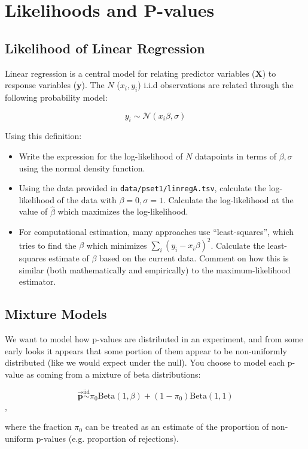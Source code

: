 \documentclass{pset}
\begin{document}
\section*{Likelihoods and P-values}

\subsection*{Likelihood of Linear Regression}

Linear regression is a central model for relating predictor variables ($\mathbf{X}$) to response variables ($\mathbf{y}$). The $N$ ($x_i, y_i$) i.i.d observations are related through the following probability model: 

$$y_i \sim \mathcal{N}(x_i\beta, \sigma)$$ 

Using this definition:

\begin{itemize}
\item Write the expression for the log-likelihood of $N$ datapoints in terms of $\beta,\sigma$ using the normal density function.
\item Using the data provided in \texttt{data/pset1/linregA.tsv}, calculate the log-likelihood of the data with $\beta = 0,\sigma=1$. Calculate the log-likelihood at the value of $\hat{\beta}$ which maximizes the log-likelihood. 
\item For computational estimation, many approaches use ``least-squares'', which tries to find the $\beta$ which minimizes $\sum_i (y_i - x_i\beta)^2$. Calculate the least-squares estimate of $\beta$ based on the current data. Comment on how this is similar (both mathematically and empirically) to the maximum-likelihood estimator.
\end{itemize}

\subsection*{Mixture Models}

We want to model how p-values are distributed in an experiment, and from some early looks it appears that some portion of them appear to be non-uniformly distributed (like we would expect under the null). You choose to model each p-value as coming from a mixture of beta distributions:

$$\overrightarrow{\mathbf{p}} \overset{\text{iid}}{\sim} \pi_0 \text{Beta}(1, \beta) + (1 - \pi_0)\text{Beta}(1,1)$$, 

where the fraction $\pi_0$ can be treated as an estimate of the proportion of non-uniform p-values (e.g. proportion of rejections).
\end{document}
